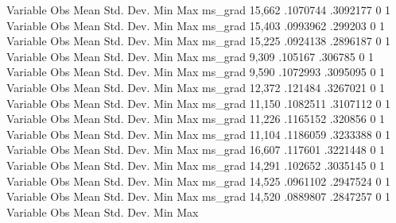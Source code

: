 {\smallskip}
    Variable {\VBAR}        Obs        Mean    Std. Dev.       Min        Max
     ms_grad {\VBAR}     15,662    .1070744    .3092177          0          1
{\smallskip}
    Variable {\VBAR}        Obs        Mean    Std. Dev.       Min        Max
     ms_grad {\VBAR}     15,403    .0993962     .299203          0          1
{\smallskip}
    Variable {\VBAR}        Obs        Mean    Std. Dev.       Min        Max
     ms_grad {\VBAR}     15,225    .0924138    .2896187          0          1
{\smallskip}
    Variable {\VBAR}        Obs        Mean    Std. Dev.       Min        Max
     ms_grad {\VBAR}      9,309     .105167     .306785          0          1
{\smallskip}
    Variable {\VBAR}        Obs        Mean    Std. Dev.       Min        Max
     ms_grad {\VBAR}      9,590    .1072993    .3095095          0          1
{\smallskip}
    Variable {\VBAR}        Obs        Mean    Std. Dev.       Min        Max
     ms_grad {\VBAR}     12,372     .121484    .3267021          0          1
{\smallskip}
    Variable {\VBAR}        Obs        Mean    Std. Dev.       Min        Max
     ms_grad {\VBAR}     11,150    .1082511    .3107112          0          1
{\smallskip}
    Variable {\VBAR}        Obs        Mean    Std. Dev.       Min        Max
     ms_grad {\VBAR}     11,226    .1165152     .320856          0          1
{\smallskip}
    Variable {\VBAR}        Obs        Mean    Std. Dev.       Min        Max
     ms_grad {\VBAR}     11,104    .1186059    .3233388          0          1
{\smallskip}
    Variable {\VBAR}        Obs        Mean    Std. Dev.       Min        Max
     ms_grad {\VBAR}     16,607     .117601    .3221448          0          1
{\smallskip}
    Variable {\VBAR}        Obs        Mean    Std. Dev.       Min        Max
     ms_grad {\VBAR}     14,291     .102652    .3035145          0          1
{\smallskip}
    Variable {\VBAR}        Obs        Mean    Std. Dev.       Min        Max
     ms_grad {\VBAR}     14,525    .0961102    .2947524          0          1
{\smallskip}
    Variable {\VBAR}        Obs        Mean    Std. Dev.       Min        Max
     ms_grad {\VBAR}     14,520    .0889807    .2847257          0          1
{\smallskip}
    Variable {\VBAR}        Obs        Mean    Std. Dev.       Min        Max
